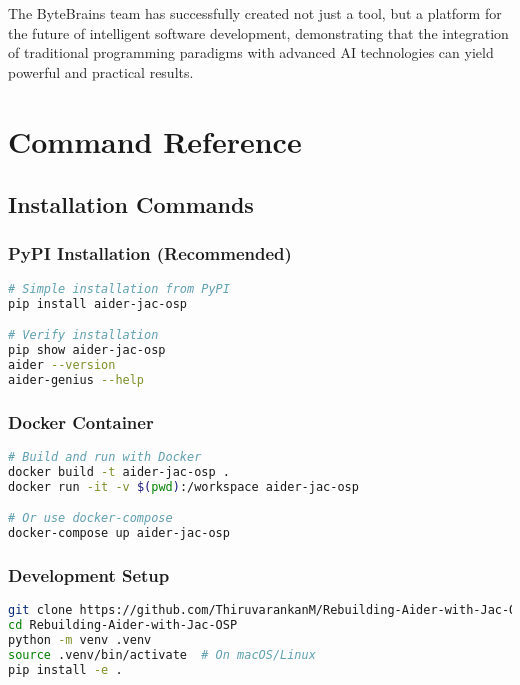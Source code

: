 \documentclass[12pt,a4paper]{article}
\begin{document}
The ByteBrains team has successfully created not just a tool, but a platform for the future of intelligent software development, demonstrating that the integration of traditional programming paradigms with advanced AI technologies can yield powerful and practical results.

\appendix

\section{Command Reference}

\subsection{Installation Commands}

\subsubsection{PyPI Installation (Recommended)}
\begin{lstlisting}[language=bash]
# Simple installation from PyPI
pip install aider-jac-osp

# Verify installation
pip show aider-jac-osp
aider --version
aider-genius --help
\end{lstlisting}

\subsubsection{Docker Container}
\begin{lstlisting}[language=bash]
# Build and run with Docker
docker build -t aider-jac-osp .
docker run -it -v $(pwd):/workspace aider-jac-osp

# Or use docker-compose
docker-compose up aider-jac-osp
\end{lstlisting}

\subsubsection{Development Setup}
\begin{lstlisting}[language=bash]
git clone https://github.com/ThiruvarankanM/Rebuilding-Aider-with-Jac-OSP.git
cd Rebuilding-Aider-with-Jac-OSP
python -m venv .venv
source .venv/bin/activate  # On macOS/Linux
pip install -e .
\end{lstlisting}
\end{document}
